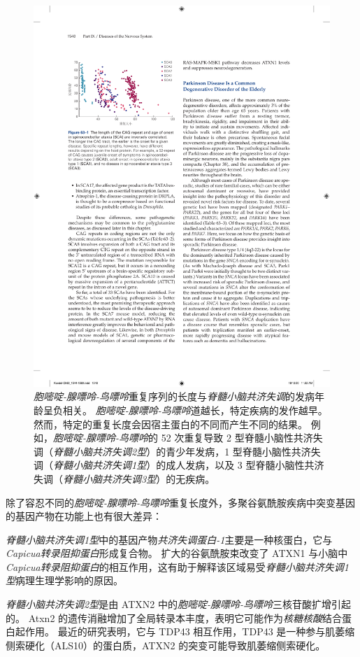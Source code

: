 \begin{figure}[htbp]
	\centering
	\includegraphics[width=0.7\linewidth]{chap63/fig_63_1}
	\caption{\textit{胞嘧啶-腺嘌呤-鸟嘌呤}重复序列的长度与\textit{脊髓小脑共济失调}的发病年龄呈负相关。
		\textit{胞嘧啶-腺嘌呤-鸟嘌呤}道越长，特定疾病的发作越早。
		然而，特定的重复长度会因宿主蛋白的不同而产生不同的结果。
		例如，\textit{胞嘧啶-腺嘌呤-鸟嘌呤}的 52 次重复导致 2 型脊髓小脑性共济失调（\textit{脊髓小脑共济失调2型}）的青少年发病，1 型脊髓小脑性共济失调（\textit{脊髓小脑共济失调1型}）的成人发病，以及 3 型脊髓小脑性共济失调（\textit{脊髓小脑共济失调3型}）的无疾病。}
	\label{fig:63_1}
\end{figure}


除了容忍不同的\textit{胞嘧啶-腺嘌呤-鸟嘌呤}重复长度外，多聚谷氨酰胺疾病中突变基因的基因产物在功能上也有很大差异：


\textit{脊髓小脑共济失调1型}中的基因产物\textit{共济失调蛋白-1}主要是一种核蛋白，它与\textit{Capicua转录阻抑蛋白}形成复合物。
扩大的谷氨酰胺束改变了 ATXN1 与小脑中\textit{Capicua转录阻抑蛋白}的相互作用，这有助于解释该区域易受\textit{脊髓小脑共济失调1型}病理生理学影响的原因。


\textit{脊髓小脑共济失调2型}是由 ATXN2 中的\textit{胞嘧啶-腺嘌呤-鸟嘌呤}三核苷酸扩增引起的。
Atxn2 的遗传消融增加了全局转录本丰度，表明它可能作为\textit{核糖核酸}结合蛋白起作用。
最近的研究表明，它与 TDP43 相互作用，TDP43 是一种参与肌萎缩侧索硬化（ALS10）的蛋白质，ATXN2 的突变可能导致肌萎缩侧索硬化。


